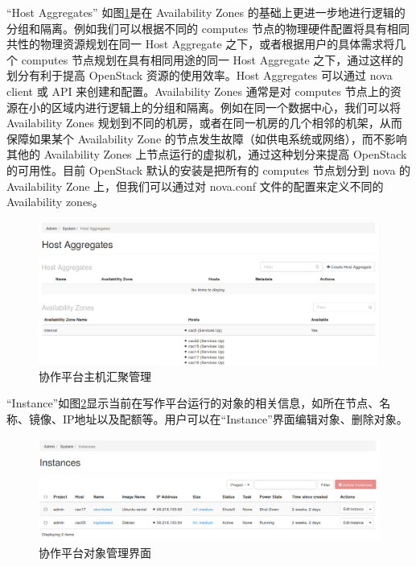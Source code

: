 \documentclass[12pt]{ctexart}%
\begin{document}
``Host Aggregates'' 如图\ref{fig:adminsystemhostagregates}是在 Availability Zones 的基础上更进一步地进行逻辑的分组和隔离。例如我们可以根据不同的 computes 节点的物理硬件配置将具有相同共性的物理资源规划在同一 Host Aggregate 之下，或者根据用户的具体需求将几个 computes 节点规划在具有相同用途的同一 Host Aggregate 之下，通过这样的划分有利于提高 OpenStack 资源的使用效率。Host Aggregates 可以通过 nova client 或 API 来创建和配置。Availability Zones 通常是对 computes 节点上的资源在小的区域内进行逻辑上的分组和隔离。例如在同一个数据中心，我们可以将 Availability Zones 规划到不同的机房，或者在同一机房的几个相邻的机架，从而保障如果某个 Availability Zone 的节点发生故障（如供电系统或网络），而不影响其他的 Availability Zones 上节点运行的虚拟机，通过这种划分来提高 OpenStack 的可用性。目前 OpenStack 默认的安装是把所有的 computes 节点划分到 nova 的 Availability Zone 上，但我们可以通过对 nova.conf 文件的配置来定义不同的 Availability zones。
\begin{figure}[!htb]
\centering
\includegraphics[width=6in]{./figures/Admin_System_HostAggregates}
\caption{协作平台主机汇聚管理}
\label{fig:adminsystemhostagregates}
\end{figure}
``Instance''如图\ref{fig:adminsysteminstances}显示当前在写作平台运行的对象的相关信息，如所在节点、名称、镜像、IP地址以及配额等。用户可以在``Instance''界面编辑对象、删除对象。
\begin{figure}[!htb]
\centering
\includegraphics[width=6in]{./figures/Admin_System_Instances}
\caption{协作平台对象管理界面}
\label{fig:adminsysteminstances}
\end{figure}
\end{document}
